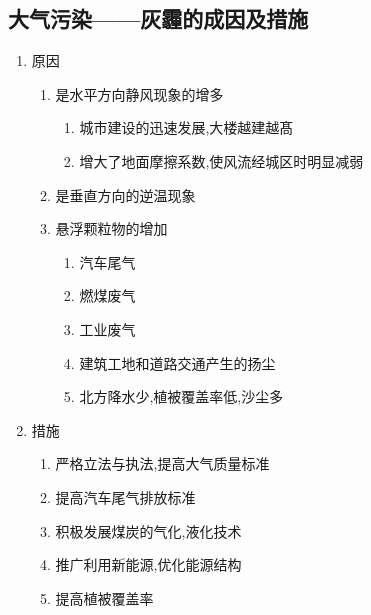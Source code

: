 \documentclass[a4paper]{article}
\begin{document}
    \subsection{大气污染——灰霾的成因及措施}
    \begin{enumerate}
        \item 原因
        \begin{enumerate}
            \item 是水平方向静风现象的增多
            \begin{enumerate}
                \item 城市建设的迅速发展,大楼越建越髙
                \item 增大了地面摩擦系数,使风流经城区时明显减弱
            \end{enumerate}
            \item 是垂直方向的逆温现象
            \item 悬浮颗粒物的增加
            \begin{enumerate}
                \item 汽车尾气
                \item 燃煤废气
                \item 工业废气
                \item 建筑工地和道路交通产生的扬尘
                \item 北方降水少,植被覆盖率低,沙尘多
            \end{enumerate}
        \end{enumerate}
        \item 措施
        \begin{enumerate}
            \item 严格立法与执法,提高大气质量标准
            \item 提高汽车尾气排放标准
            \item 积极发展煤炭的气化,液化技术
            \item 推广利用新能源,优化能源结构
            \item 提高植被覆盖率
        \end{enumerate}
    \end{enumerate}
\end{document}
